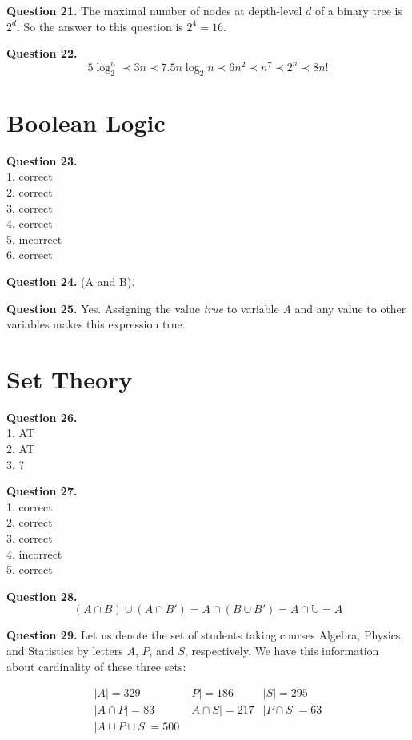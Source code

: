 \documentclass[10pt,a4paper]{article}
\newcommand{\question}[1]{\bigskip \noindent \textbf{Question #1.}}
\begin{document}
\question{21} The maximal number of nodes at depth-level $d$ of a binary tree is $2^d$. So the answer to this question is $2^4 = 16$. 

\question{22}
\begin{equation*}
5 \log_2^n \prec 3n \prec 7.5 n \log_2{n} \prec 6n^2 \prec n^7 \prec 2^n \prec 8n!
\end{equation*}

\section{Boolean Logic}

\question{23} \\
1. correct \\
2. correct \\
3. correct \\
4. correct \\
5. incorrect \\
6. correct 

\question{24} (A and B).

\question{25} Yes. Assigning the value \emph{true} to variable \emph{A} and any value to other variables makes this expression true. 

\section{Set Theory}

\question{26} \\
1. AT \\
2. AT \\
3. ?

\question{27} \\
1. correct \\
2. correct \\
3. correct \\
4. incorrect \\
5. correct

\question{28} 
\begin{equation*}
(A \cap B) \cup (A \cap B') = A \cap (B \cup B') = A \cap \mathbb{U} = A
\end{equation*}

\question{29}
Let us denote the set of students taking courses Algebra, Physics, and Statistics by letters $A$, $P$, and $S$, respectively. We have this information about cardinality of these three sets:

\begin{equation*}
	\begin{array}{lll}
	 |A| = 329							& |P| = 186				& |S| = 295 \\
	 |A \cap P| = 83				& |A \cap S| = 217	& |P \cap S| = 63 \\
	 |A \cup P \cup S| = 500	& &
	\end{array}
\end{equation*}
\end{document}
